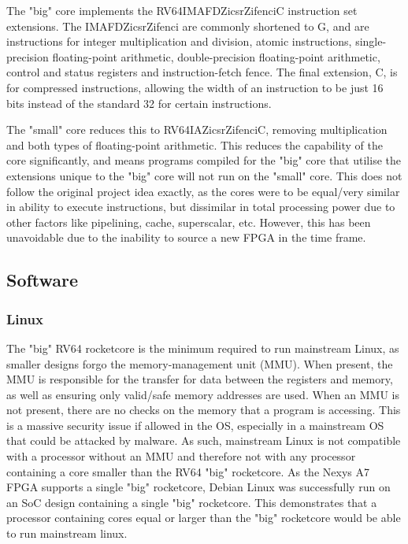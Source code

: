 The "big" core implements the RV64IMAFDZicsrZifenciC instruction set extensions. The IMAFDZicsrZifenci are commonly shortened to G, and are instructions for integer multiplication and division, atomic instructions, single-precision floating-point arithmetic, double-precision floating-point arithmetic, control and status registers and instruction-fetch fence. The final extension, C, is for compressed instructions, allowing the width of an instruction to be just 16 bits instead of the standard 32 for certain instructions. 

The "small" core reduces this to RV64IAZicsrZifenciC, removing multiplication and both types of floating-point arithmetic. This reduces the capability of the core significantly, and means programs compiled for the "big" core that utilise the extensions unique to the "big" core will not run on the "small" core. This does not follow the original project idea exactly, as the cores were to be equal/very similar in ability to execute instructions, but dissimilar in total processing power due to other factors like pipelining, cache, superscalar, etc. However, this has been unavoidable due to the inability to source a new FPGA in the time frame.

\subsection{Software}
\subsubsection{Linux}
The "big" RV64 rocketcore is the minimum required to run mainstream Linux, as smaller designs forgo the memory-management unit (MMU). When present, the MMU\cite{} is responsible for the transfer for data between the registers and memory, as well as ensuring only valid/safe memory addresses are used. When an MMU is not present, there are no checks on the memory that a program is accessing. This is a massive security issue if allowed in the OS, especially in a mainstream OS that could be attacked by malware. As such, mainstream Linux is not compatible with a processor without an MMU\cite{} and therefore not with any processor containing a core smaller than the RV64 "big" rocketcore. As the Nexys A7 FPGA supports a single "big" rocketcore, Debian Linux\cite{debianriscv} was successfully run on an SoC design containing a single "big" rocketcore. This demonstrates that a processor containing cores equal or larger than the "big" rocketcore would be able to run mainstream linux.

